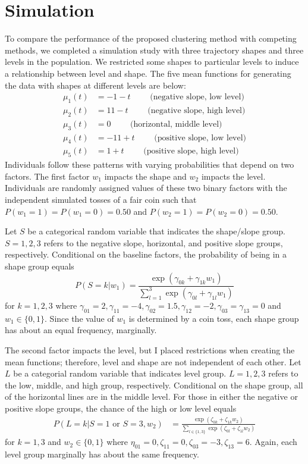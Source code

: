 \documentclass[12pt]{article}
\begin{document}
\section{Simulation}
To compare the performance of the proposed clustering method with competing methods, we completed a simulation study with three trajectory shapes and three levels in the population. We restricted some shapes to particular levels to induce a relationship between level and shape. The five mean functions for generating the data with shapes at different levels are below:   
\begin{align*}
\mu_{1}(t) &= -1 - t \quad\quad\text{ (negative slope, low level)}\\
\mu_{2}(t) &= 11 - t\quad\quad\text{ (negative slope, high level)}\\
\mu_{3}(t) &= 0\quad\quad\text{ (horizontal, middle level)}\\
\mu_{4}(t) &= -11 + t\quad\quad\text{ (positive slope, low level)}\\
\mu_{5}(t) &= 1 + t\quad\quad\text{ (positive slope, high level)}
\end{align*} 
Individuals follow these patterns with varying probabilities that depend on two factors. The first factor $w_{1}$ impacts the shape and $w_{2}$ impacts the level. Individuals are randomly assigned values of these two binary factors with the independent simulated tosses of a fair coin such that $P(w_{1}=1) = P(w_{1}=0) = 0.50$ and $P(w_{2}=1) = P(w_{2}=0)=0.50$. 

Let $S$ be a categorical random variable that indicates the shape/slope group. $S=1,2,3$ refers to the negative slope, horizontal, and positive slope groups, respectively. Conditional on the baseline factors, the probability of being in a shape group equals
$$P(S=k |w_{1}) = \frac{\exp(\gamma_{0k}+\gamma_{1k}w_{1})}{\sum^{3}_{l=1} \exp(\gamma_{0l}+\gamma_{1l}w_{1})}$$
for $k=1,2,3$ where $\gamma_{01}=2,\gamma_{11} = -4,\gamma_{02}=1.5,\gamma_{12}=-2,\gamma_{03}=\gamma_{13} = 0$ and $w_{1}\in\{0,1\}$. Since the value of $w_{1}$ is determined by a coin toss, each shape group has about an equal frequency, marginally. 

The second factor impacts the level, but I placed restrictions when creating the mean functions; therefore, level and shape are not independent of each other. Let $L$ be a categorial random variable that indicates level group. $L=1,2,3$ refers to the low, middle, and high group, respectively. Conditional on the shape group, all of the horizontal lines are in the middle level. For those in either the negative or positive slope groups, the chance of the high or low level equals
\begin{align*}
P(L=k|S=1 \text{ or } S=3,w_{2}) & = \frac{\exp(\zeta_{0k}+\zeta_{1k} w_{2})}{\sum_{l\in\{1,3\} }\exp(\zeta_{0l}+\zeta_{1l}w_{2})}
\end{align*}
for $k=1,3$ and $w_{2}\in\{0,1\}$ where $\eta_{01}=0,\zeta_{11}=0,\zeta_{03}=-3,\zeta_{13}=6$. Again, each level group marginally has about the same frequency.
\end{document}
